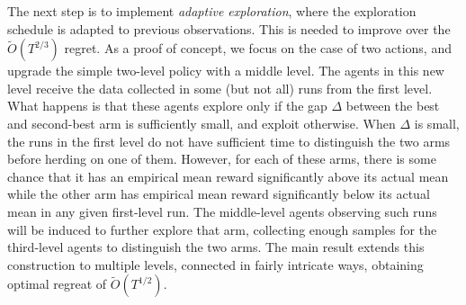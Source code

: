 The next step is to implement \emph{adaptive exploration}, where the exploration schedule is adapted to previous observations. This is needed to improve over the $\tilde{O}(T^{2/3})$ regret. As a proof of concept, we focus on the case of two actions, and upgrade the simple two-level policy with a middle level. The agents in this new level receive the data collected in some (but not all) runs from the first level. What happens is that these agents explore only if the gap $\Delta$ between the best and second-best arm is sufficiently small, and exploit otherwise. When $\Delta$ is small, the runs in the first level do not have sufficient time to distinguish the two arms before herding on one of them.  However, for each of these arms, there is some chance that it has an empirical mean reward significantly above its actual mean while the other arm has empirical mean reward significantly below its actual mean in any given first-level run.  The middle-level agents observing such runs will be induced to further explore that arm, collecting enough samples for the third-level agents to distinguish the two arms. The main result extends this construction to multiple levels, connected in fairly intricate ways, obtaining optimal regreat of $\tilde{O}(T^{1/2})$.



